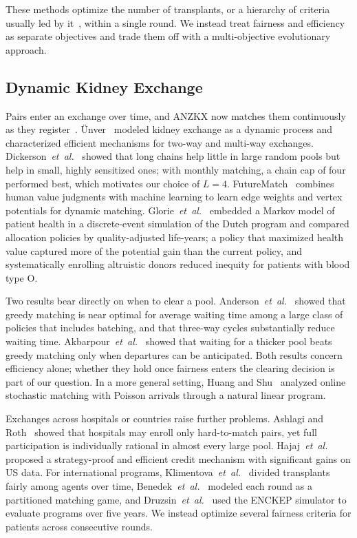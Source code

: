 \documentclass[journal]{IEEEtran}
\begin{document}
These methods optimize the number of transplants, or a hierarchy of
criteria usually led by it~\cite{biro2021modelling}, within a single
round.
We instead treat fairness and efficiency as separate objectives and
trade them off with a multi-objective evolutionary approach.

\subsection{Dynamic Kidney Exchange}
\label{sec:related:dynamic}

Pairs enter an exchange over time, and ANZKX now matches them
continuously as they register~\cite{ANZKX2021}.
\"{U}nver~\cite{unver2010dynamic} modeled kidney exchange as a dynamic
process and characterized efficient mechanisms for two-way and
multi-way exchanges.
Dickerson~\textit{et~al.}~\cite{dickerson2012optimizing} showed that long
chains help little in large random pools but help in small, highly
sensitized ones; with monthly matching, a chain cap of four performed
best, which motivates our choice of $L = 4$.
FutureMatch~\cite{dickerson2015futurematch} combines human value
judgments with machine learning to learn edge weights and vertex
potentials for dynamic matching.
Glorie~\textit{et~al.}~\cite{glorie2022health} embedded a Markov model
of patient health in a discrete-event simulation of the Dutch program
and compared allocation policies by quality-adjusted life-years; a
policy that maximized health value captured more of the potential gain
than the current policy, and systematically enrolling altruistic
donors reduced inequity for patients with blood type O.

Two results bear directly on when to clear a pool.
Anderson~\textit{et~al.}~\cite{anderson2017efficient} showed that greedy
matching is near optimal for average waiting time among a large class
of policies that includes batching, and that three-way cycles
substantially reduce waiting time.
Akbarpour~\textit{et~al.}~\cite{akbarpour2020thickness} showed that
waiting for a thicker pool beats greedy matching only when departures
can be anticipated.
Both results concern efficiency alone; whether they hold once fairness
enters the clearing decision is part of our question.
In a more general setting, Huang and Shu~\cite{huang2021online} analyzed
online stochastic matching with Poisson arrivals through a natural
linear program.

Exchanges across hospitals or countries raise further problems.
Ashlagi and Roth~\cite{ashlagi2014free} showed that hospitals may enroll
only hard-to-match pairs, yet full participation is individually
rational in almost every large pool.
Hajaj~\textit{et~al.}~\cite{hajaj2015strategy} proposed a strategy-proof
and efficient credit mechanism with significant gains on US data.
For international programs,
Klimentova~\textit{et~al.}~\cite{klimentova2021fairness} divided
transplants fairly among agents over time,
Benedek~\textit{et~al.}~\cite{benedek2025partitioned} modeled each
round as a partitioned matching game, and
Druzsin~\textit{et~al.}~\cite{druzsin2024enckep} used the ENCKEP
simulator to evaluate programs over five years.
We instead optimize several fairness criteria for patients across
consecutive rounds.
\end{document}
